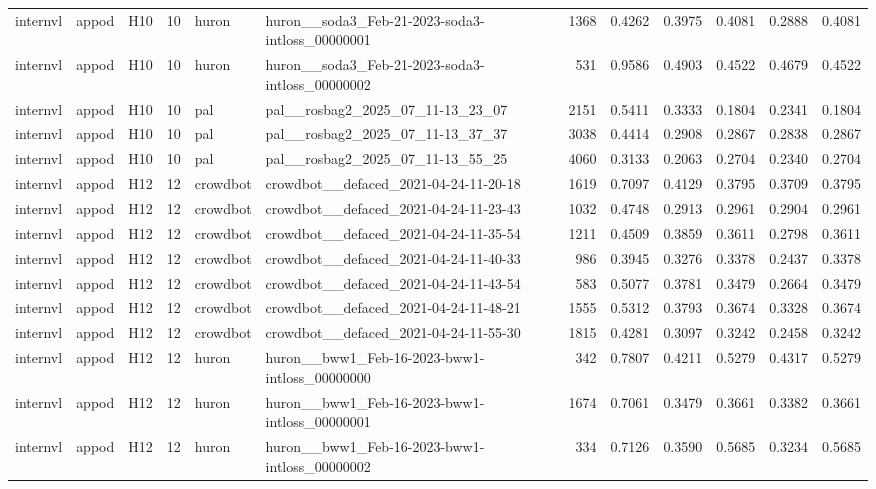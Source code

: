\begin{table}[tbp]
\begin{tabular}{lllrllrrrrrr}
internvl & appod & H10 & 10 & huron & huron\_\_soda3\_Feb-21-2023-soda3-intloss\_00000001 & 1368 & 0.4262 & 0.3975 & 0.4081 & 0.2888 & 0.4081 \\
internvl & appod & H10 & 10 & huron & huron\_\_soda3\_Feb-21-2023-soda3-intloss\_00000002 & 531 & 0.9586 & 0.4903 & 0.4522 & 0.4679 & 0.4522 \\
internvl & appod & H10 & 10 & pal & pal\_\_rosbag2\_2025\_07\_11-13\_23\_07 & 2151 & 0.5411 & 0.3333 & 0.1804 & 0.2341 & 0.1804 \\
internvl & appod & H10 & 10 & pal & pal\_\_rosbag2\_2025\_07\_11-13\_37\_37 & 3038 & 0.4414 & 0.2908 & 0.2867 & 0.2838 & 0.2867 \\
internvl & appod & H10 & 10 & pal & pal\_\_rosbag2\_2025\_07\_11-13\_55\_25 & 4060 & 0.3133 & 0.2063 & 0.2704 & 0.2340 & 0.2704 \\
internvl & appod & H12 & 12 & crowdbot & crowdbot\_\_defaced\_2021-04-24-11-20-18 & 1619 & 0.7097 & 0.4129 & 0.3795 & 0.3709 & 0.3795 \\
internvl & appod & H12 & 12 & crowdbot & crowdbot\_\_defaced\_2021-04-24-11-23-43 & 1032 & 0.4748 & 0.2913 & 0.2961 & 0.2904 & 0.2961 \\
internvl & appod & H12 & 12 & crowdbot & crowdbot\_\_defaced\_2021-04-24-11-35-54 & 1211 & 0.4509 & 0.3859 & 0.3611 & 0.2798 & 0.3611 \\
internvl & appod & H12 & 12 & crowdbot & crowdbot\_\_defaced\_2021-04-24-11-40-33 & 986 & 0.3945 & 0.3276 & 0.3378 & 0.2437 & 0.3378 \\
internvl & appod & H12 & 12 & crowdbot & crowdbot\_\_defaced\_2021-04-24-11-43-54 & 583 & 0.5077 & 0.3781 & 0.3479 & 0.2664 & 0.3479 \\
internvl & appod & H12 & 12 & crowdbot & crowdbot\_\_defaced\_2021-04-24-11-48-21 & 1555 & 0.5312 & 0.3793 & 0.3674 & 0.3328 & 0.3674 \\
internvl & appod & H12 & 12 & crowdbot & crowdbot\_\_defaced\_2021-04-24-11-55-30 & 1815 & 0.4281 & 0.3097 & 0.3242 & 0.2458 & 0.3242 \\
internvl & appod & H12 & 12 & huron & huron\_\_bww1\_Feb-16-2023-bww1-intloss\_00000000 & 342 & 0.7807 & 0.4211 & 0.5279 & 0.4317 & 0.5279 \\
internvl & appod & H12 & 12 & huron & huron\_\_bww1\_Feb-16-2023-bww1-intloss\_00000001 & 1674 & 0.7061 & 0.3479 & 0.3661 & 0.3382 & 0.3661 \\
internvl & appod & H12 & 12 & huron & huron\_\_bww1\_Feb-16-2023-bww1-intloss\_00000002 & 334 & 0.7126 & 0.3590 & 0.5685 & 0.3234 & 0.5685 \\

\end{tabular}
\end{table}
